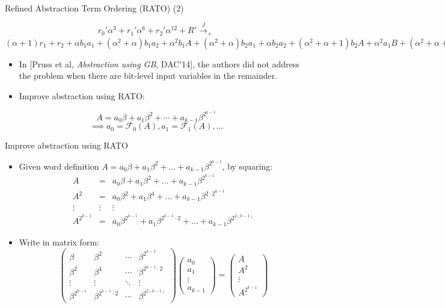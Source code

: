 \documentclass[xcolor=dvipsnames]{beamer}
\newcommand{\bi}{\begin{itemize}}
\newcommand{\ei}{\end{itemize}}
\begin{document}
\begin{frame}{\large{Refined Abstraction Term Ordering (RATO) (2)}}
\begin{Example}
$$r_0'\alpha^3+r_1'\alpha^6+r_2'\alpha^{12}+R' \xrightarrow{J}_+$$
$(\alpha+1) r_1+r_2+\alpha b_1 a_1+(\alpha^2+\alpha) b_1 a_2+\alpha^2 b_1 A+(\alpha^2+\alpha) b_2 a_1+\alpha b_2 a_2+
(\alpha^2+\alpha+1) b_2 A+\alpha^2 a_1 B+(\alpha^2+\alpha+1) a_2 B+R'+(\alpha+1) R+(\alpha+1) A B$
\end{Example}
\bi
\item In [Pruss et al, {\it Abstraction using GB}, DAC'14], the authors did not address the problem when there are bit-level
input variables in the remainder.
\item Improve abstraction using RATO:
\ei
\begin{displaymath}
A = a_0\beta+a_1\beta^2+\cdots+a_{k-1}\beta^{2^{k-1}}
\end{displaymath}
\begin{displaymath}
\implies a_0 = \mathcal F_0(A), a_1 = \mathcal F_1(A), \dots
\end{displaymath}
\end{frame}
\begin{frame}{\large{Improve abstraction using RATO}}
\bi
\item Given word definition $A = a_0 \beta + a_1\beta^2 + \dots + a_{k-1}\beta^{2^{k-1}}$,
by squaring:
\begin{eqnarray}
A & = & a_0 \beta + a_1\beta^2 + \dots + a_{k-1}\beta^{2^{k-1}}\nonumber\\
A^2 & = & a_0 \beta^{2}+ a_1 \beta^{4} + \dots + a_{k-1}
\beta^{2\cdot 2^{k-1}} \nonumber\\
\vdots & \vdots& \vdots \nonumber\\
A^{2^{k-1}} & = & a_0 \beta^{2^{k-1}}  +  a_1 \beta^{2^{k-1}\cdot 2} +
\dots + a_{k-1}\beta^{2^{2(k-1)}} \nonumber
\end{eqnarray}
\item Write in matrix form:
\begin{displaymath}
\begin{pmatrix}
\beta & \beta^2 & \cdots & \beta^{2^{k-1}} \\
\beta^2 & \beta^4 & \cdots & \beta^{2^{k-1}\cdot 2} \\
\vdots & \vdots & \ddots & \vdots \\
\beta^{2^{k-1}} & \beta^{2^{k-1}\cdot 2} & \cdots & \beta^{2^{2(k-1)}}
\end{pmatrix}
\begin{pmatrix}
a_0\\
a_1\\
\vdots\\
a_{k-1}
\end{pmatrix}
=
\begin{pmatrix}
A\\
A^2\\
\vdots\\
A^{2^{k-1}}
\end{pmatrix}
\end{displaymath}
\ei
\end{frame}
\end{document}
